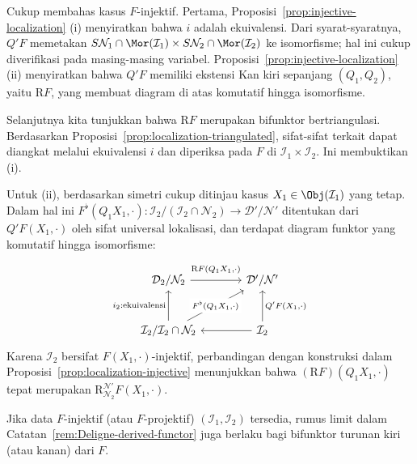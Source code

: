 \begin{bukti}
	Cukup membahas kasus $F$-injektif. Pertama,
	Proposisi~\ref{prop:injective-localization} (i) menyiratkan bahwa $i$ adalah
	ekuivalensi. Dari syarat-syaratnya, $Q'F$ memetakan
	$S\mathcal{N}_1\cap\Mor(\mathcal{I}_1)\times
	S\mathcal{N}_2\cap\Mor(\mathcal{I}_2)$ ke isomorfisme; hal ini cukup
	diverifikasi pada masing-masing variabel. Proposisi~\ref{prop:injective-localization}
	(ii) menyiratkan bahwa $Q'F$ memiliki ekstensi Kan kiri sepanjang
	$(Q_1,Q_2)$, yaitu $\mathrm{R}F$, yang membuat diagram di atas komutatif
	hingga isomorfisme.

	Selanjutnya kita tunjukkan bahwa $\mathrm{R}F$ merupakan bifunktor
	bertriangulasi. Berdasarkan Proposisi~\ref{prop:localization-triangulated},
	sifat-sifat terkait dapat diangkat melalui ekuivalensi $i$ dan diperiksa
	pada $F$ di $\mathcal{I}_1\times\mathcal{I}_2$. Ini membuktikan (i).

	Untuk (ii), berdasarkan simetri cukup ditinjau kasus
	$X_1\in\Obj(\mathcal{I}_1)$ yang tetap. Dalam hal ini
	$F^\flat(Q_1X_1,\cdot):
	\mathcal{I}_2/(\mathcal{I}_2\cap\mathcal{N}_2)
	\to\mathcal{D}'/\mathcal{N}'$ ditentukan dari $Q'F(X_1,\cdot)$ oleh sifat
	universal lokalisasi, dan terdapat diagram funktor yang komutatif hingga
	isomorfisme:
	\[\begin{tikzcd}[column sep=large, row sep=large]
		\mathcal{D}_2 / \mathcal{N}_2 \arrow[r, "{\mathrm{R}F(Q_1 X_1, \cdot)}" inner sep=0.6em] & \mathcal{D}'/ \mathcal{N}' \\
		\mathcal{I}_2 / \mathcal{I}_2 \cap \mathcal{N}_2 \arrow[u, "{i_2: \text{ekuivalensi}}"] \arrow[ru, "{F^\flat(Q_1 X_1, \cdot)}" description] & \mathcal{I}_2 \arrow[l] \arrow[u, "{Q' F(X_1, \cdot)}"']
	\end{tikzcd}\]
	Karena $\mathcal{I}_2$ bersifat $F(X_1,\cdot)$-injektif, perbandingan dengan
	konstruksi dalam Proposisi~\ref{prop:localization-injective} menunjukkan
	bahwa $(\mathrm{R}F)(Q_1X_1,\cdot)$ tepat merupakan
	$\mathrm{R}^{\mathcal{N}'}_{\mathcal{N}_2}F(X_1,\cdot)$.
\end{bukti}

Jika data $F$-injektif (atau $F$-projektif)
$(\mathcal{I}_1,\mathcal{I}_2)$ tersedia, rumus limit dalam
Catatan~\ref{rem:Deligne-derived-functor} juga berlaku bagi bifunktor turunan
kiri (atau kanan) dari $F$.
